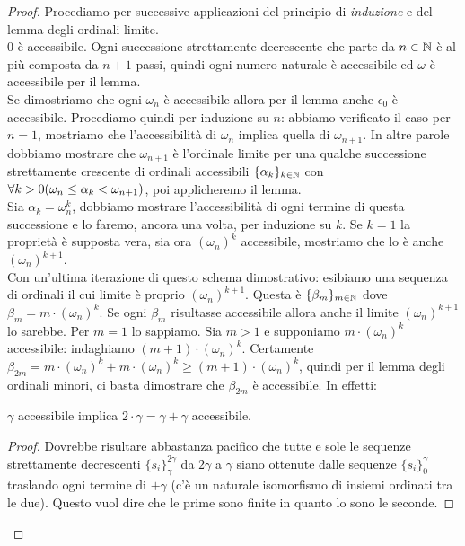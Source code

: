 	\begin{proof}
		Procediamo per successive applicazioni del principio di \emph{induzione} e del lemma degli ordinali limite. \\
		$0$ è accessibile. Ogni successione strettamente decrescente che parte da $n\in\mathbb{N}$ è al più composta da $n+1$ passi, quindi ogni numero naturale è accessibile ed $\omega$ è accessibile per il lemma. \\
		Se dimostriamo che ogni $\omega_{n}$ è accessibile allora per il lemma anche $\epsilon_{0}$ è accessibile. Procediamo quindi per induzione su $n$: abbiamo verificato il caso per $n=1$, mostriamo che l'accessibilità di $\omega_{n}$ implica quella di $\omega_{n+1}$. In altre parole dobbiamo mostrare che $\omega_{n+1}$ è l'ordinale limite per una qualche successione strettamente crescente di ordinali accessibili $\{\alpha_{k}\}_{k\in\mathbb{N}}$ con $\forall k>0 (\omega_{n}\leq\alpha_{k}<\omega_{n+1})$, poi applicheremo il lemma. \\
		Sia $\alpha_{k}=\omega_{n}^k$, dobbiamo mostrare l'accessibilità di ogni termine di questa successione e lo faremo, ancora una volta, per induzione su $k$. Se $k=1$ la proprietà è supposta vera, sia ora $(\omega_{n})^k$ accessibile, mostriamo che lo è anche $(\omega_{n})^{k+1}$. \\
		Con un'ultima iterazione di questo schema dimostrativo: esibiamo una sequenza di ordinali il cui limite è proprio $(\omega_{n})^{k+1}$. Questa è $\{\beta_{m}\}_{m\in\mathbb{N}}$ dove $\beta_{m} = m\cdot(\omega_{n})^k$. Se ogni $\beta_{m}$ risultasse accessibile allora anche il limite $(\omega_{n})^{k+1}$ lo sarebbe.
		Per $m=1$ lo sappiamo. Sia $m>1$ e supponiamo $m\cdot(\omega_{n})^k$ accessibile: indaghiamo $(m+1)\cdot(\omega_{n})^k$. Certamente $\beta_{2m} = m\cdot(\omega_{n})^k+m\cdot(\omega_{n})^k \ge (m+1)\cdot(\omega_{n})^k$, quindi per il lemma degli ordinali minori, ci basta dimostrare che $\beta_{2m}$ è accessibile. In effetti:
		\begin{lemma}
			$\gamma$ accessibile implica $2\cdot\gamma=\gamma+\gamma$ accessibile.
		\end{lemma}
		\begin{proof}
			Dovrebbe risultare abbastanza pacifico che tutte e sole le sequenze strettamente decrescenti $\{s_{i}\}^{2\gamma}_{\gamma}$ da $2\gamma$ a $\gamma$ siano ottenute dalle sequenze $\{s_{i}\}^{\gamma}_{0}$ traslando ogni termine di $+\gamma$ (c'è un naturale isomorfismo di insiemi ordinati tra le due). Questo vuol dire che le prime sono finite in quanto lo sono le seconde.

\end{proof}
\end{proof}
